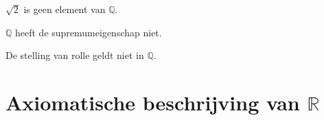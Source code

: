 \documentclass[main.tex]{subfiles}
\begin{document}
\begin{st}
  $\sqrt{2}$ is geen element van $\mathbb{Q}$.
\end{st}

\begin{st}
  $\mathbb{Q}$ heeft de supremumeigenschap niet.
\end{st}

\begin{st}
  De stelling van rolle geldt niet in $\mathbb{Q}$.
\end{st}


\section{Axiomatische beschrijving van $\mathbb{R}$}
\label{sec:axiom-beschr-van}
\end{document}
